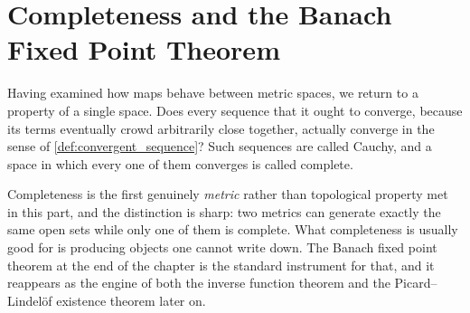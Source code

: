 %
\chapter{Completeness and the Banach Fixed Point Theorem}
\label{ch:completeness}

Having examined how maps behave between metric spaces, we return to a property of a single space.
Does every sequence that  it ought to converge, because its terms eventually crowd
arbitrarily close together, actually converge in the sense of \cref{def:convergent_sequence}?
Such sequences are called Cauchy, and a space in which every one of them converges is called
complete.

Completeness is the first genuinely \emph{metric} rather than topological property met in this
part, and the distinction is sharp: two metrics can generate exactly the same open sets while
only one of them is complete. What completeness is usually good for is producing objects one
cannot write down. The Banach fixed point theorem at the end of the chapter is the standard
instrument for that, and it reappears as the engine of both the inverse function theorem and the
Picard--Lindelöf existence theorem later on.





